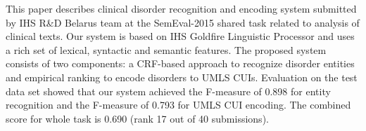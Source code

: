 This paper describes clinical disorder recognition and encoding system submitted by IHS R\&D Belarus team at the SemEval-2015 shared task related to analysis of clinical texts. Our system is based on IHS Goldfire Linguistic Processor and uses a rich set of lexical, syntactic and semantic features. The proposed system consists of two components: a CRF-based approach to recognize disorder entities and empirical ranking to encode disorders to UMLS CUIs. Evaluation on the test data set showed that our system achieved the F-measure of 0.898 for entity recognition and the F-measure of 0.793 for UMLS CUI encoding. The combined score for whole task is 0.690 (rank 17 out of 40 submissions).
